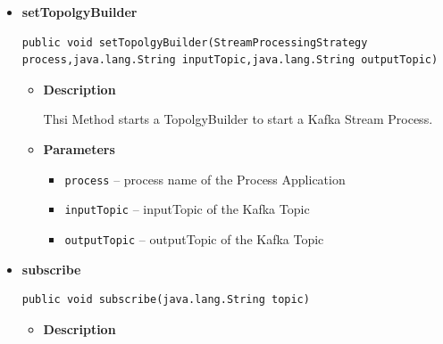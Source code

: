 {{{{{{{{{{{{{{{{{\begin{itemize}
{\begin{itemize}
{This Method sets the Properties File
}
\item{
{\bf  Parameters}
  \begin{itemize}
   \item{
\texttt{props} -- props is the Propertyfile form where the controller reads his Settings}
  \end{itemize}
}%
\end{itemize}
}%
\item{ 
\hypertarget{Controller.Controller.setTopolgyBuilder(StreamProcessingStrategy, java.lang.String, java.lang.String)}{{\bf  setTopolgyBuilder}\\}
\begin{lstlisting}[frame=none]
public void setTopolgyBuilder(StreamProcessingStrategy process,java.lang.String inputTopic,java.lang.String outputTopic)\end{lstlisting} %
\begin{itemize}
\item{
{\bf  Description}

Thsi Method starts a TopolgyBuilder to start a Kafka Stream Process.
}
\item{
{\bf  Parameters}
  \begin{itemize}
   \item{
\texttt{process} -- process name of the Process Application}
   \item{
\texttt{inputTopic} -- inputTopic of the Kafka Topic}
   \item{
\texttt{outputTopic} -- outputTopic of the Kafka Topic}
  \end{itemize}
}%
\end{itemize}
}%
\item{ 
\hypertarget{Controller.Controller.subscribe(java.lang.String)}{{\bf  subscribe}\\}
\begin{lstlisting}[frame=none]
public void subscribe(java.lang.String topic)\end{lstlisting} %
\begin{itemize}
\item{
{\bf  Description}

}
\end{itemize}}
\end{itemize}}}}}}}}}}}}}}}}}}
